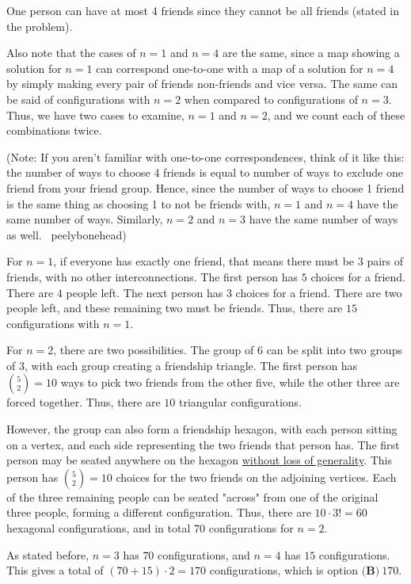 \begin{enumerate}
 One person can have at most 4 friends since they cannot be all friends (stated in the problem).

 Also note that the cases of $n=1$ and $n=4$ are the same, since a map showing a solution for $n=1$ can correspond one-to-one with a map of a solution for $n=4$ by simply making every pair of friends non-friends and vice versa.  The same can be said of configurations with $n=2$ when compared to configurations of $n=3$.  Thus, we have two cases to examine, $n=1$ and $n=2$, and we count each of these combinations twice.

 (Note: If you aren’t familiar with one-to-one correspondences, think of it like this: the number of ways to choose 4 friends is equal to number of ways to exclude one friend from your friend group. Hence, since the number of ways to choose 1 friend is the same thing as choosing 1 to not be friends with, $n=1$ and $n=4$ have the same number of ways. Similarly, $n=2$ and $n=3$ have the same number of ways as well. ~peelybonehead)

 For $n=1$, if everyone has exactly one friend, that means there must be $3$ pairs of friends, with no other interconnections.  The first person has $5$ choices for a friend.  There are $4$ people left.  The next person has $3$ choices for a friend.  There are two people left, and these remaining two must be friends.  Thus, there are $15$ configurations with $n=1$.

 For $n=2$, there are two possibilities.  The group of $6$ can be split into two groups of $3$, with each group creating a friendship triangle.  The first person has $\binom{5}{2} = 10$ ways to pick two friends from the other five, while the other three are forced together.  Thus, there are $10$ triangular configurations.  

 However, the group can also form a friendship hexagon, with each person sitting on a vertex, and each side representing the two friends that person has.  The first person may be seated anywhere on the hexagon \href{https://artofproblemsolving.com/wiki/index.php?title=Without\_loss\_of\_generality}{without loss of generality}.  This person has $\binom{5}{2} = 10$ choices for the two friends on the adjoining vertices.  Each of the three remaining people can be seated "across" from one of the original three people, forming a different configuration.  Thus, there are $10 \cdot 3! = 60$ hexagonal configurations, and in total $70$ configurations for $n=2$.

 As stated before, $n=3$ has $70$ configurations, and $n=4$ has $15$ configurations.  This gives a total of $(70 + 15)\cdot 2 = 170$ configurations, which is option $\boxed{\textbf{(B)}\ 170}$.


\end{enumerate}
